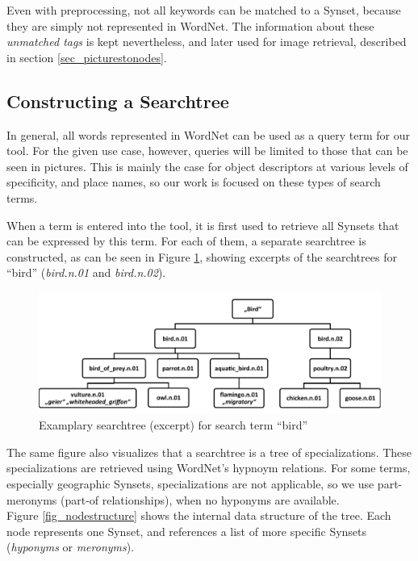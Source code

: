 Even with preprocessing, not all keywords can be matched to a Synset, because they are simply not represented in WordNet. The information about these \emph{unmatched tags} is kept nevertheless, and later used for image retrieval, described in section \ref{sec_picturestonodes}.


\subsection{Constructing a Searchtree}
\label{sec_searchtreeconstruction}
In general, all words represented in WordNet can be used as a query term for our tool.  For the given use case, however, queries will be limited to those that can be seen in pictures. This is mainly the case for object descriptors at various levels of specificity, and place names, so our work is focused on these types of search terms.

When a term is entered into the tool, it is first used to retrieve all Synsets that can be expressed by this term. For each of them, a separate searchtree is constructed, as can be seen in Figure \ref{fig_searchtree}, showing excerpts of the searchtrees for ``bird'' (\emph{bird.n.01} and \emph{bird.n.02}).

\begin{figure}[h]
\includegraphics[width=\textwidth]{images/searchtree.pdf}
\caption{Examplary searchtree (excerpt) for search term ``bird''}
\label{fig_searchtree}
\end{figure}

The same figure also visualizes that a searchtree is a tree of specializations. These specializations are retrieved using WordNet's hypnoym relations. For some terms, especially geographic Synsets, specializations are not applicable, so we use part-meronyms (part-of relationships), when no hyponyms are available.\\


Figure \ref{fig_nodestructure} shows the internal data structure of the tree. Each node represents one Synset, and references a list of more specific Synsets (\emph{hyponyms} or \emph{meronyms}).

